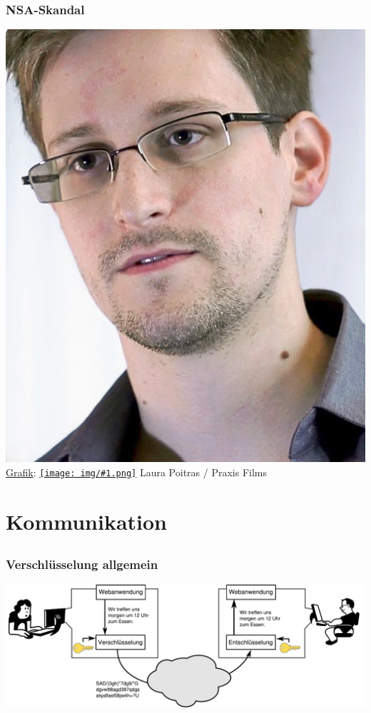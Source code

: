 \documentclass[12pt]{beamer}
\newcommand{\cc}[1]{\texttt{[image: img/\#1.png]}\hspace{1mm}}
\begin{document}
\begin{frame}
    \frametitle{NSA-Skandal}
    \begin{center}
	\includegraphics[height=0.7\textheight]{img/snowden.jpg}
	\\{\small \href{https://commons.wikimedia.org/wiki/File:Edward_Snowden.jpg\#mediaviewer/File:Edward_Snowden-2.jpg}{Grafik}: \href{https://creativecommons.org/licenses/by/3.0/}{\cc{by}} Laura Poitras / Praxis Films}
    \end{center}	
\end{frame}

\section{Kommunikation}
\subsection{}
\begin{frame}
    \frametitle{Verschlüsselung allgemein}
    \begin{center}
	\includegraphics[width=\textwidth]{img/krypto.pdf}
    \end{center}	
\end{frame}
\end{document}
